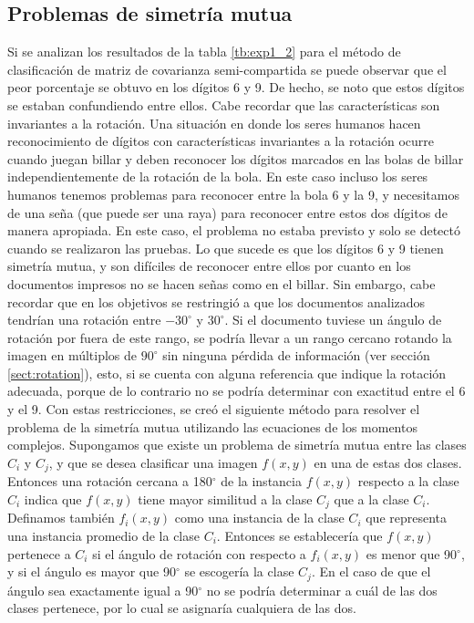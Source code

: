 \documentclass[a4paper, 11pt, oneside]{report}
\begin{document}
\subsection{Problemas de simetría mutua}
\label{sect:mutualSym}
Si se analizan los resultados de la tabla \ref{tb:exp1_2} para el método de clasificación de matriz de covarianza semi-compartida se puede observar que el peor porcentaje se obtuvo en los dígitos 6 y 9. De hecho, se noto que estos dígitos se estaban confundiendo entre ellos.
Cabe recordar que las características son invariantes a la rotación. Una situación en donde los seres humanos hacen reconocimiento de dígitos con características invariantes a la rotación ocurre cuando juegan billar y deben reconocer los dígitos marcados en las bolas de billar independientemente de la rotación de la bola. En este caso incluso los seres humanos tenemos problemas para reconocer entre la bola 6 y la 9, y necesitamos de una seña (que puede ser una raya) para reconocer entre estos dos dígitos de manera apropiada.
En este caso, el problema no estaba previsto y solo se detectó cuando se realizaron las pruebas. Lo que sucede es que los dígitos 6 y 9 tienen simetría mutua, y son difíciles de reconocer entre ellos por cuanto en los documentos impresos no se hacen señas como en el billar. Sin embargo, cabe recordar que en los objetivos se restringió a que los documentos analizados tendrían una rotación entre $-30^\circ$ y $30^\circ$. Si el documento tuviese un ángulo de rotación por fuera de este rango, se podría llevar a un rango cercano rotando la imagen en múltiplos de $90^\circ$ sin ninguna pérdida de información (ver sección \ref{sect:rotation}), esto, si se cuenta con alguna referencia que indique la rotación adecuada, porque de lo contrario no se podría determinar con exactitud entre el 6 y el 9.
Con estas restricciones, se creó el siguiente método para resolver el problema de la simetría mutua utilizando las ecuaciones de los momentos complejos. Supongamos que existe un problema de simetría mutua entre las clases $C_i$ y $C_j$, y que se desea clasificar una imagen $f(x,y)$ en una de estas dos clases. Entonces una rotación cercana a 180$^\circ$ de la instancia $f(x,y)$ respecto a la clase $C_i$ indica que $f(x,y)$ tiene mayor similitud a la clase $C_j$ que a la clase $C_i$. Definamos también $f_i(x,y)$ como una instancia de la clase $C_i$ que representa una instancia promedio de la clase $C_i$. Entonces se establecería que $f(x,y)$ pertenece a $C_i$ si el ángulo de rotación con respecto a $f_i(x,y)$ es menor que 90$^\circ$, y si el ángulo es mayor que 90$^\circ$ se escogería la clase $C_j$. En el caso de que el ángulo sea exactamente igual a 90$^\circ$ no se podría determinar a cuál de las dos clases pertenece, por lo cual se asignaría cualquiera de las dos.
\end{document}
